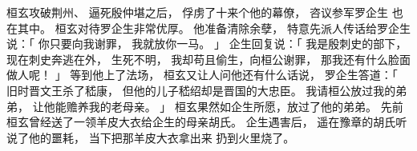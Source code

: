 \switchcolumn

桓玄攻破荆州、
逼死殷仲堪之后，
俘虏了十来个他的幕僚，
咨议参军罗企生
也在其中。
桓玄对待罗企生非常优厚。
他准备清除余孽，
特意先派人传话给罗企生说：「
    你只要向我谢罪，
    我就放你一马。
」
企生回复说：「
    我是殷刺史的部下，
    现在刺史奔逃在外，
    生死不明，
    我却苟且偷生，向桓公谢罪，
    那我还有什么脸面做人呢！
」
等到他上了法场，
桓玄又让人问他还有什么话说，
罗企生答道：「
    旧时晋文王杀了嵇康，
    但他的儿子嵇绍却是晋国的大忠臣。
    我请桓公放过我的弟弟，
    让他能赡养我的老母亲。
」
桓玄果然如企生所愿，放过了他的弟弟。
先前
桓玄曾经送了一领羊皮大衣给企生的母亲胡氏。
企生遇害后，
遥在豫章的胡氏听说了他的噩耗，
当下把那羊皮大衣拿出来
扔到火里烧了。

